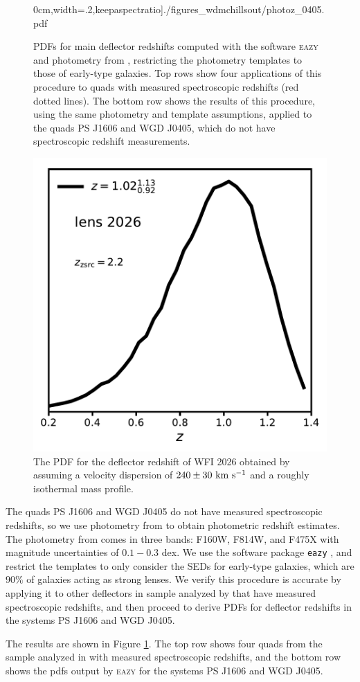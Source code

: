 \begin{figure}
	0cm,width=.2\textwidth,keepaspectratio]{./figures_wdmchillsout/photoz_0405.pdf}
	\caption{\label{fig:photozs} PDFs for main deflector redshifts computed with the software {\textsc{eazy}} and photometry from \cite{Shajib++18}, restricting the photometry templates to those of early-type galaxies. Top rows show four applications of this procedure to quads with measured spectroscopic redshifts (red dotted lines). The bottom row shows the results of this procedure, using the same photometry and template assumptions, applied to the quads PS J1606 and WGD J0405, which do not have spectroscopic redshift measurements.}
\end{figure}	
\begin{figure}
	\includegraphics[clip,trim=0cm 0cm 0cm
	0cm,width=.3\textwidth,keepaspectratio]{./figures_wdmchillsout/photoz_2026.pdf}
	\caption{\label{fig:2026z} The PDF for the deflector redshift of WFI 2026 obtained by assuming a velocity dispersion of $240 \pm 30 \ \rm{km} \ \rm{s^{-1}}$ and a roughly isothermal mass profile. }
\end{figure}
The quads PS J1606 and WGD J0405 do not have measured spectroscopic redshifts, so we use photometry from \cite{Shajib++18} to obtain photometric redshift estimates. The photometry from \cite{Shajib++18} comes in three bands: F160W, F814W, and F475X with magnitude uncertainties of $0.1-0.3$ dex. We use the software package {\tt{eazy}} \cite{Brammer++08}, and restrict the templates to only consider the SEDs for early-type galaxies, which are $90\%$ of galaxies acting as strong lenses. We verify this procedure is accurate by applying it to other deflectors in sample analyzed by \cite{Shajib++18} that have measured spectroscopic redshifts, and  then proceed to derive PDFs for deflector redshifts in the systems PS J1606 and WGD J0405. 

The results are shown in Figure \ref{fig:photozs}. The top row shows four quads from the sample analyzed in \cite{Shajib++18} with measured spectroscopic redshifts, and the bottom row shows the pdfs output by {\textsc{eazy}} for the systems PS J1606 and WGD J0405. 

